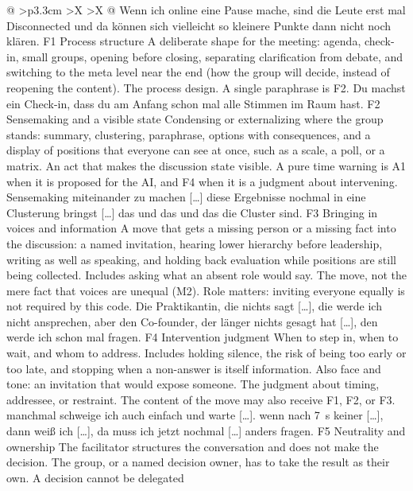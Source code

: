 \begin{xltabular}{\textwidth}{@{}
    >{\RaggedRight\arraybackslash}p{3.3cm}
    >{\RaggedRight\arraybackslash}X
    >{\RaggedRight\arraybackslash}X
  @{}}
  {Wenn ich online eine Pause mache, sind die Leute erst mal Disconnected und da können sich
  vielleicht so kleinere Punkte dann nicht noch klären.}
  \cbcatbreak
  \cbrow
  {F1}
  {Process structure}
  {A deliberate shape for the meeting: agenda, check-in, small groups, opening before
    closing, separating clarification from debate, and switching to the meta level near the end
  (how the group will decide, instead of reopening the content).}
  {The process design. A single paraphrase is F2.}
  {Du machst ein Check-in, dass du am Anfang schon mal alle Stimmen im Raum hast.}
  \cbgap
  \cbrow
  {F2}
  {Sensemaking and a visible state}
  {Condensing or externalizing where the group stands: summary, clustering, paraphrase,
    options with consequences, and a display of positions that everyone can see at once, such
  as a scale, a poll, or a matrix.}
  {An act that makes the discussion state visible. A pure time warning is A1 when it is
  proposed for the AI, and F4 when it is a judgment about intervening.}
  {Sensemaking miteinander zu machen [\ldots] diese Ergebnisse nochmal in eine Clusterung
  bringst [\ldots] das und das und das die Cluster sind.}
  \cbgap
  \cbrow
  {F3}
  {Bringing in voices and information}
  {A move that gets a missing person or a missing fact into the discussion: a named
    invitation, hearing lower hierarchy before leadership, writing as well as speaking, and
    holding back evaluation while positions are still being collected. Includes asking what an
  absent role would say.}
  {The move, not the mere fact that voices are unequal (M2). Role matters: inviting everyone
  equally is not required by this code.}
  {Die Praktikantin, die nichts sagt [\ldots], die werde ich nicht ansprechen, aber den
  Co-founder, der länger nichts gesagt hat [\ldots], den werde ich schon mal fragen.}
  \cbgap
  \cbrow
  {F4}
  {Intervention judgment}
  {When to step in, when to wait, and whom to address. Includes holding silence, the risk of
    being too early or too late, and stopping when a non-answer is itself information. Also
  face and tone: an invitation that would expose someone.}
  {The judgment about timing, addressee, or restraint. The content of the move may also
  receive F1, F2, or F3.}
  {manchmal schweige ich auch einfach und warte [\ldots]. wenn nach 7~s keiner [\ldots], dann
  weiß ich [\ldots], da muss ich jetzt nochmal [\ldots] anders fragen.}
  \cbgap
  \cbrow
  {F5}
  {Neutrality and ownership}
  {The facilitator structures the conversation and does not make the decision. The group, or
    a named decision owner, has to take the result as their own. A decision cannot be delegated
}
\end{xltabular}
